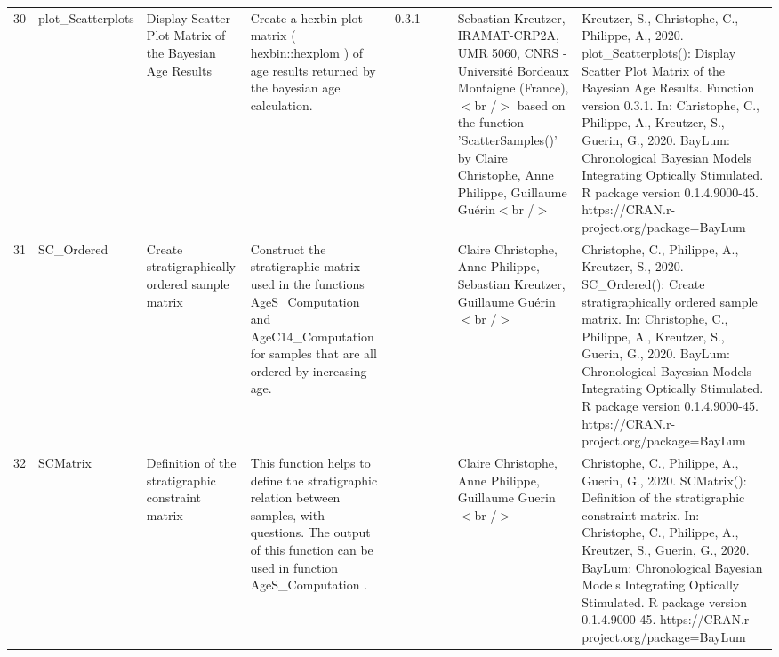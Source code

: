 \begin{table}[ht]
\begin{tabular}{rllllllll}
 \\ 
  30 & plot\_Scatterplots & Display Scatter Plot Matrix of the Bayesian Age Results & Create a hexbin plot matrix ( hexbin::hexplom ) of age results returned by the bayesian age calculation. & 0.3.1
 &  &  & Sebastian Kreutzer, IRAMAT-CRP2A, UMR 5060, CNRS - Université Bordeaux Montaigne (France),$<$br /$>$ based on the function 'ScatterSamples()' by Claire Christophe, Anne Philippe, Guillaume Guérin$<$br /$>$ & Kreutzer, S., Christophe, C., Philippe, A., 2020. plot\_Scatterplots(): Display Scatter Plot Matrix of the Bayesian Age Results. Function version 0.3.1. In: Christophe, C., Philippe, A., Kreutzer, S., Guerin, G., 2020. BayLum: Chronological Bayesian Models Integrating Optically Stimulated. R package version 0.1.4.9000-45. https://CRAN.r-project.org/package=BayLum
 \\ 
  31 & SC\_Ordered & Create stratigraphically ordered sample matrix & Construct the stratigraphic matrix used in the functions  AgeS\_Computation  and  AgeC14\_Computation  for samples that are all ordered by increasing age. &  &  &  & Claire Christophe, Anne Philippe, Sebastian Kreutzer, Guillaume Guérin$<$br /$>$ & Christophe, C., Philippe, A., Kreutzer, S., 2020. SC\_Ordered(): Create stratigraphically ordered sample matrix. In: Christophe, C., Philippe, A., Kreutzer, S., Guerin, G., 2020. BayLum: Chronological Bayesian Models Integrating Optically Stimulated. R package version 0.1.4.9000-45. https://CRAN.r-project.org/package=BayLum
 \\ 
  32 & SCMatrix & Definition of the stratigraphic constraint matrix & This function helps to define the stratigraphic relation between samples, with questions. The output of this function can be used in function  AgeS\_Computation . &  &  &  & Claire Christophe, Anne Philippe, Guillaume Guerin$<$br /$>$ & Christophe, C., Philippe, A., Guerin, G., 2020. SCMatrix(): Definition of the stratigraphic constraint matrix. In: Christophe, C., Philippe, A., Kreutzer, S., Guerin, G., 2020. BayLum: Chronological Bayesian Models Integrating Optically Stimulated. R package version 0.1.4.9000-45. https://CRAN.r-project.org/package=BayLum
 \\ 
   \hline
\end{tabular}
\end{table}

